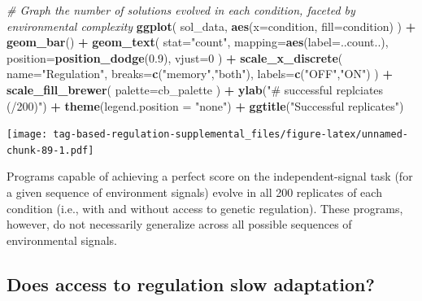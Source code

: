 \documentclass[]{book}
\newenvironment{Shaded}{\begin{snugshade}}{\end{snugshade}}
\newcommand{\CommentTok}[1]{\textcolor[rgb]{0.56,0.35,0.01}{\textit{#1}}}
\newcommand{\DataTypeTok}[1]{\textcolor[rgb]{0.13,0.29,0.53}{#1}}
\newcommand{\DecValTok}[1]{\textcolor[rgb]{0.00,0.00,0.81}{#1}}
\newcommand{\FloatTok}[1]{\textcolor[rgb]{0.00,0.00,0.81}{#1}}
\newcommand{\KeywordTok}[1]{\textcolor[rgb]{0.13,0.29,0.53}{\textbf{#1}}}
\newcommand{\NormalTok}[1]{#1}
\newcommand{\OperatorTok}[1]{\textcolor[rgb]{0.81,0.36,0.00}{\textbf{#1}}}
\newcommand{\StringTok}[1]{\textcolor[rgb]{0.31,0.60,0.02}{#1}}
\begin{document}
\begin{Shaded}
\begin{Highlighting}[]
\CommentTok{# Graph the number of solutions evolved in each condition, faceted by environmental complexity}
\KeywordTok{ggplot}\NormalTok{( sol_data, }\KeywordTok{aes}\NormalTok{(}\DataTypeTok{x=}\NormalTok{condition, }\DataTypeTok{fill=}\NormalTok{condition) ) }\OperatorTok{+}
\StringTok{  }\KeywordTok{geom_bar}\NormalTok{() }\OperatorTok{+}
\StringTok{  }\KeywordTok{geom_text}\NormalTok{(}
    \DataTypeTok{stat=}\StringTok{"count"}\NormalTok{,}
    \DataTypeTok{mapping=}\KeywordTok{aes}\NormalTok{(}\DataTypeTok{label=}\NormalTok{..count..),}
    \DataTypeTok{position=}\KeywordTok{position_dodge}\NormalTok{(}\FloatTok{0.9}\NormalTok{),}
    \DataTypeTok{vjust=}\DecValTok{0}
\NormalTok{  ) }\OperatorTok{+}
\StringTok{  }\KeywordTok{scale_x_discrete}\NormalTok{(}
    \DataTypeTok{name=}\StringTok{"Regulation"}\NormalTok{,}
    \DataTypeTok{breaks=}\KeywordTok{c}\NormalTok{(}\StringTok{"memory"}\NormalTok{,}\StringTok{"both"}\NormalTok{),}
    \DataTypeTok{labels=}\KeywordTok{c}\NormalTok{(}\StringTok{"OFF"}\NormalTok{,}\StringTok{"ON"}\NormalTok{)}
\NormalTok{  ) }\OperatorTok{+}
\StringTok{  }\KeywordTok{scale_fill_brewer}\NormalTok{(}
    \DataTypeTok{palette=}\NormalTok{cb_palette}
\NormalTok{  ) }\OperatorTok{+}
\StringTok{  }\KeywordTok{ylab}\NormalTok{(}\StringTok{"# successful replciates (/200)"}\NormalTok{) }\OperatorTok{+}
\StringTok{  }\KeywordTok{theme}\NormalTok{(}\DataTypeTok{legend.position =} \StringTok{"none"}\NormalTok{) }\OperatorTok{+}
\StringTok{  }\KeywordTok{ggtitle}\NormalTok{(}\StringTok{"Successful replicates"}\NormalTok{)}
\end{Highlighting}
\end{Shaded}

\texttt{[image: tag-based-regulation-supplemental\_files/figure-latex/unnamed-chunk-89-1.pdf]}

Programs capable of achieving a perfect score on the independent-signal task (for a given sequence of environment signals) evolve in all 200 replicates of each condition (i.e., with and without access to genetic regulation).
These programs, however, do not necessarily generalize across all possible sequences of environmental signals.

\hypertarget{does-access-to-regulation-slow-adaptation}{%
\subsection{Does access to regulation slow adaptation?}\label{does-access-to-regulation-slow-adaptation}}
\end{document}
